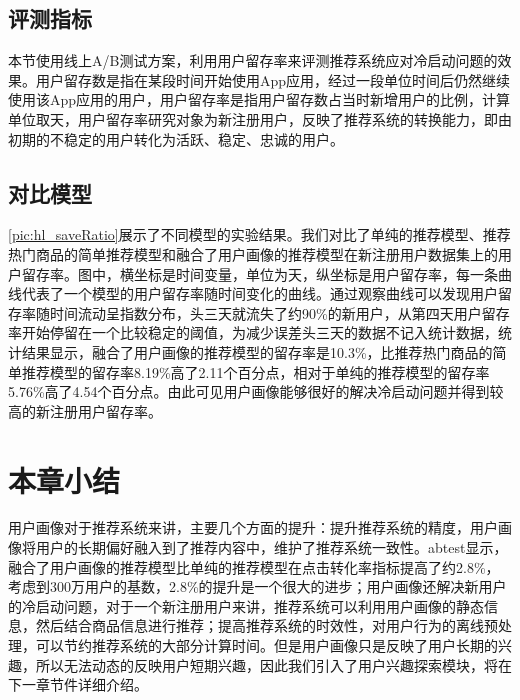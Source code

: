     \subsection{评测指标}
    本节使用线上A/B测试方案\citep{ab-test}，利用用户留存率来评测推荐系统应对冷启动问题的效果。用户留存数是指在某段时间开始使用App应用，经过一段单位时间后仍然继续使用该App应用的用户，用户留存率是指用户留存数占当时新增用户的比例，计算单位取天，用户留存率研究对象为新注册用户，反映了推荐系统的转换能力，即由初期的不稳定的用户转化为活跃、稳定、忠诚的用户。
    \subsection{对比模型}
    \autoref{pic:hl_saveRatio}展示了不同模型的实验结果。我们对比了单纯的推荐模型、推荐热门商品的简单推荐模型和融合了用户画像的推荐模型在新注册用户数据集上的用户留存率。图中，横坐标是时间变量，单位为天，纵坐标是用户留存率，每一条曲线代表了一个模型的用户留存率随时间变化的曲线。通过观察曲线可以发现用户留存率随时间流动呈指数分布，头三天就流失了约90\%的新用户，从第四天用户留存率开始停留在一个比较稳定的阈值，为减少误差头三天的数据不记入统计数据，统计结果显示，融合了用户画像的推荐模型的留存率是10.3\%，比推荐热门商品的简单推荐模型的留存率8.19\%高了2.11个百分点，相对于单纯的推荐模型的留存率5.76\%高了4.54个百分点。由此可见用户画像能够很好的解决冷启动问题并得到较高的新注册用户留存率。
    \begin{figure}
    \centering
      \label{pic:hl_saveRatio}
    \end{figure}

  \section{本章小结}
    用户画像对于推荐系统来讲，主要几个方面的提升：提升推荐系统的精度，用户画像将用户的长期偏好融入到了推荐内容中，维护了推荐系统一致性。abtest显示，融合了用户画像的推荐模型比单纯的推荐模型在点击转化率指标提高了约2.8\%，考虑到300万用户的基数，2.8\%的提升是一个很大的进步；用户画像还解决新用户的冷启动问题，对于一个新注册用户来讲，推荐系统可以利用用户画像的静态信息，然后结合商品信息进行推荐；提高推荐系统的时效性，对用户行为的离线预处理，可以节约推荐系统的大部分计算时间。但是用户画像只是反映了用户长期的兴趣，所以无法动态的反映用户短期兴趣，因此我们引入了用户兴趣探索模块，将在下一章节件详细介绍。
